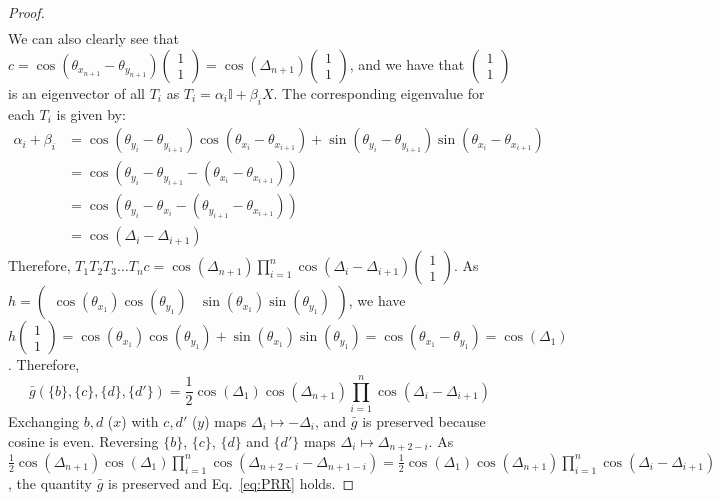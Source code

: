 \documentclass[aps,floatfix,10pt,amssymb,amsfont,amsmath,superscriptaddress,float,nofootinbib,longbibliography,nobalancelastpage,twocolumn]{revtex4-2}
\begin{document}
\begin{widetext}
\begin{proof}
\begin{align}
\end{align}
We can also clearly see that $c = \cos (\theta_{x_{n+1}} -\theta_{y_{n+1}}) \begin{pmatrix}
    1\\1
\end{pmatrix} =  \cos(\Delta_{n+1})\begin{pmatrix}
    1\\1
\end{pmatrix} $, and we have that $\begin{pmatrix}
    1\\1
\end{pmatrix}$ is an eigenvector of all $T_i$ as $T_i = \alpha_i \mathbb{I} + \beta_i X$. The corresponding eigenvalue for each $T_i$ is given by:
\begin{align}
    \alpha_i+\beta_i&=\cos (\theta_{y_i} - \theta_{y_{i+1}})\cos (\theta_{x_{i}} - \theta_{x_{i+1}}) + \sin (\theta_{y_i} - \theta_{y_{i+1}})\sin (\theta_{x_{i}} - \theta_{x_{i+1}}) \\
    &= \cos(\theta_{y_i} - \theta_{y_{i+1}} - (\theta_{x_{i}} - \theta_{x_{i+1}}))\\
    &= \cos\!\left(\theta_{y_i} - \theta_{x_i} - (\theta_{y_{i+1}} - \theta_{x_{i+1}})\right)\\
    &= \cos(\Delta_i - \Delta_{i+1})
\end{align}
Therefore, $T_1T_2T_3\ldots T_nc = \cos(\Delta_{n+1})\prod_{i=1}^{n}\cos(\Delta_i - \Delta_{i+1})\begin{pmatrix}
    1\\1
\end{pmatrix}$. As $h = \begin{pmatrix}
    \cos(\theta_{x_1})\cos(\theta_{y_1})& \sin(\theta_{x_1})\sin(\theta_{y_1})
\end{pmatrix}$, we have $h\begin{pmatrix}
    1\\1
\end{pmatrix}= \cos(\theta_{x_1})\cos(\theta_{y_1}) + \sin(\theta_{x_1})\sin(\theta_{y_1}) = \cos(\theta_{x_1}-\theta_{y_1}) = \cos(\Delta_1)$. Therefore,
\begin{equation}
    \bar g(\{b\},\{c\},\{d\},\{d'\}) =\frac{1}{2}\cos(\Delta_1)\cos(\Delta_{n+1})\prod_{i=1}^{n}\cos(\Delta_i - \Delta_{i+1})
\end{equation}
  Exchanging $b,d$ ($x$) with $c,d'$ ($y$) maps $\Delta_i\mapsto-\Delta_i$, and $\bar g$ is preserved because cosine is even. Reversing $\{b\}$, $\{c\}$, $\{d\}$ and $\{d'\}$ maps $\Delta_i\mapsto\Delta_{n+2-i}$. As $\frac{1}{2}\cos(\Delta_{n+1})\cos(\Delta_{1})\prod_{i=1}^{n}\cos(\Delta_{n+2-i} - \Delta_{n+1-i}) = \frac{1}{2}\cos(\Delta_1)\cos(\Delta_{n+1})\prod_{i=1}^{n}\cos(\Delta_i - \Delta_{i+1})$, the quantity $\bar g$ is preserved and Eq.~\eqref{eq:PRR} holds.

\end{proof}
\end{widetext}
\end{document}
